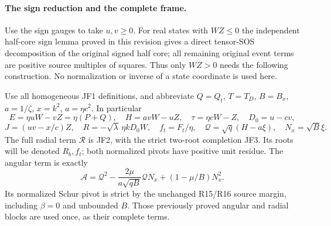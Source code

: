 \paragraph{The sign reduction and the complete frame.}
Use the sign gauges to take $u,v\ge0$. For real states with $WZ\le0$
the independent half-core sign lemma proved in this revision gives a
direct tensor-SOS decomposition of the original signed half core;
all remaining original event terms are positive source multiples
of squares. Thus only $WZ>0$ needs the following construction. No
normalization or inverse of a state coordinate is used here.

Use all homogeneous JF1 definitions, and abbreviate $Q=Q_t$,
$T=T_D$, $B=B_x$, $a=1/\zeta$, $x=k^2$, $a=\eta c^2$. In particular
\[
 E=\eta uW-vZ=\eta(P+Q),\quad H=avW-uZ,
 \quad \tau=\eta cW-Z,\quad D_0=u-cv,
\]
\[
 J=(uv-x/c)Z,\quad
 R=-\sqrt\lambda\,\eta kD_0W,\quad
 f_t=F_t/\eta,\quad \mathcal Q=\sqrt q(H-a\xi),
 \quad N_x=\sqrt B\xi.
\]
The full radial term $\mathscr R$ is JF2, with the strict two-root
completion JF3. Its roots will be denoted $R_b,f_t$; both normalized
pivots have positive unit residue. The angular term is exactly
\[
 \mathscr A=\mathcal Q^2
       -\frac{2\mu}{a\sqrt{qB}}\mathcal QN_x
       +(1-\mu/B)N_x^2.                              \tag{DG2}
\]
Its normalized Schur pivot is strict by the unchanged R15/R16 source
margin, including $\beta=0$ and unbounded $B$. Those previously
proved angular and radial blocks are used once, as their complete
terms.

